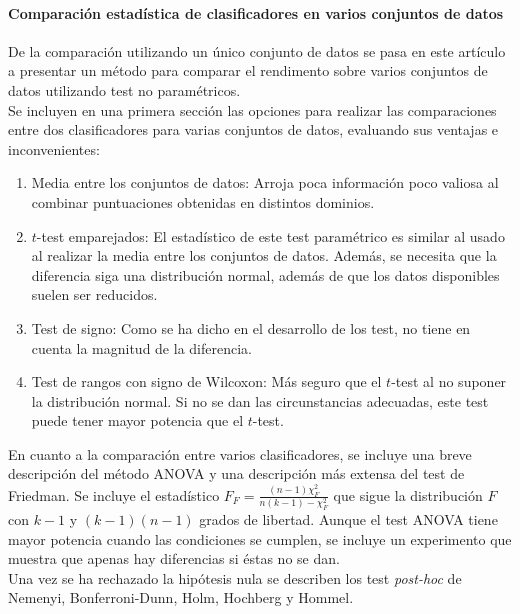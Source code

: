 \paragraph{Comparación estadística de clasificadores en 
varios conjuntos de datos} \cite{DEMSAR06} De la comparación 
utilizando un único conjunto de datos se pasa en este 
artículo a presentar un método para comparar el rendimento 
sobre varios conjuntos de datos utilizando test no 
paramétricos.\\
	Se incluyen en una primera sección las opciones para 
realizar las comparaciones entre dos clasificadores para 
varias conjuntos de datos, evaluando sus ventajas e 
inconvenientes:
	\begin{enumerate}
	\item Media entre los conjuntos de datos: Arroja poca 
		información poco valiosa al combinar puntuaciones 
		obtenidas en distintos dominios.
	\item $t$-test emparejados: El estadístico de este test 
		paramétrico es similar al usado al realizar la media 
		entre los conjuntos de datos. Además, se necesita que 
		la diferencia siga una distribución normal, además de 
		que los datos disponibles suelen ser reducidos. 
	\item Test de signo: Como se ha dicho en el desarrollo de 
		los test, no tiene en cuenta la magnitud de la 
		diferencia.
	\item Test de rangos con signo de Wilcoxon: Más seguro 
		que el $t$-test al no suponer la distribución normal. 
		Si no se dan las circunstancias adecuadas, este test 
		puede tener mayor potencia que el $t$-test.
	\end{enumerate}
	
	En cuanto a la comparación entre varios clasificadores, 
se incluye una breve descripción del método ANOVA y una 
descripción más extensa del test de Friedman. Se incluye el 
estadístico $F_F = \frac{(n-1) \chi^2_F}{n(k-1) - \chi^2_F}$ 
que sigue la distribución $F$ con $k-1$ y $(k-1)(n-1)$ grados 
de libertad. Aunque el test ANOVA tiene mayor potencia cuando 
las condiciones se cumplen, se incluye un experimento que 
muestra que apenas hay diferencias si éstas no se dan.\\

	Una vez se ha rechazado la hipótesis nula se describen 
los test \textit{post-hoc} de Nemenyi, Bonferroni-Dunn, Holm, 
Hochberg y Hommel.
	
	
